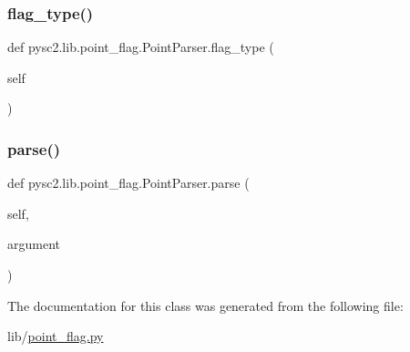 \subsubsection{\texorpdfstring{flag\+\_\+type()}{flag\_type()}}
{\footnotesize\ttfamily def pysc2.\+lib.\+point\+\_\+flag.\+Point\+Parser.\+flag\+\_\+type (\begin{DoxyParamCaption}\item[{}]{self }\end{DoxyParamCaption})}

\mbox{\label{classpysc2_1_1lib_1_1point__flag_1_1_point_parser_a1b67e8dc82473826ef576675e06ec672}} 
\subsubsection{\texorpdfstring{parse()}{parse()}}
{\footnotesize\ttfamily def pysc2.\+lib.\+point\+\_\+flag.\+Point\+Parser.\+parse (\begin{DoxyParamCaption}\item[{}]{self,  }\item[{}]{argument }\end{DoxyParamCaption})}



The documentation for this class was generated from the following file\+:\begin{DoxyCompactItemize}
\item 
lib/\mbox{\hyperlink{point__flag_8py}{point\+\_\+flag.\+py}}\end{DoxyCompactItemize}
